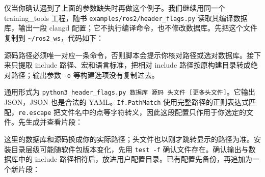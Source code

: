 \begin{example}[给指定头文件补上当前源码的解析参数]
仅当你确认遇到了上面的参数缺失时再做这个例子。我们继续用同一个 training\_tools 工程，随书 \nolinkurl{examples/ros2/header_flags.py} 读取其编译数据库，输出一段 clangd 配置；它不执行编译命令，也不修改数据库。先把这个文件复制到 \texttt{\textasciitilde/ros2\_ws}，代码如下：
\par\medskip\noindent\begin{minipage}{\linewidth}

\end{minipage}\par\smallskip
源码路径必须唯一对应一条命令，否则脚本会提示你核对路径或选对数据库。接下来只提取 include 路径、宏和语言标准，把相对 include 路径按原构建目录转成绝对路径；输出参数 \texttt{-o} 等构建选项没有复制过去。
\par\medskip\noindent\begin{minipage}{\linewidth}

\end{minipage}\par\smallskip
通用形式为 \texttt{python3 header\_flags.py 数据库 源码 头文件 [更多头文件]}。它输出 JSON，JSON 也是合法的 YAML。\texttt{If.PathMatch} 使用完整路径的正则表达式匹配，\texttt{re.escape} 把文件名中的点等字符转义，因此这段配置只作用于你选定的文件。先生成并查看片段：
\par\medskip\noindent\begin{minipage}{\linewidth}
\end{minipage}\par\smallskip
这里的数据库和源码换成你的实际路径；头文件也以刚才跳转显示的路径为准。安装目录层级可能随软件包版本变化，先用 \texttt{test -f} 确认文件存在。确认输出与数据库中的 include 路径相符后，放进用户配置目录。已有配置先备份，再追加为一个新片段：

\end{example}
